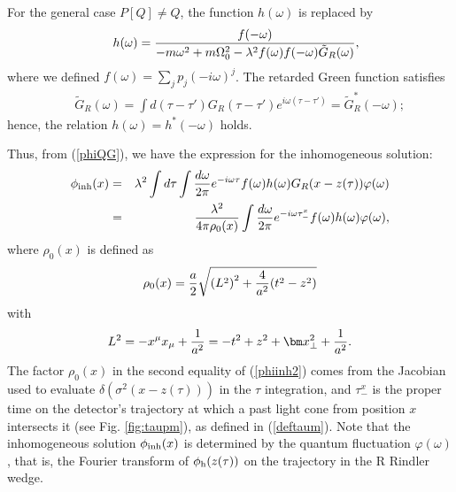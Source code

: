 \documentclass[aps,prd,preprintnumbers,nofootinbib,showpacs]{revtex4}%
\begin{document}
\begin{widetext}
For the general case $P[Q]\neq Q$, the function $h(\omega)$ is replaced by
\begin{eqnarray}
&&h(\omega)={f(-\omega)\over -m\omega^2+m\Omega_0^2-\lambda^2f(\omega)f(-\omega)\tilde G_R(\omega)}, 
\label{defhomega}
\end{eqnarray}
where we defined $f(\omega)=\sum_j p_j(-i\omega)^j$. The retarded Green function satisfies
\begin{eqnarray}
&&\tilde G_R(\omega)= \int d(\tau-\tau') G_R(\tau-\tau') e^{i\omega(\tau-\tau')}=\tilde G_R^*(-\omega);
\label{deftildeGR}
\end{eqnarray}
hence, the relation $h(\omega)=h^*(-\omega)$ holds. 

Thus, from (\ref{phiQG}), we have the expression for the inhomogeneous solution: 
\begin{eqnarray}
\phi_{\rm inh}(x)&=&\lambda^2 \int d\tau\int {d\omega\over2\pi}e^{-i\omega\tau}
f(\omega)h(\omega)G_R(x-z(\tau))\varphi(\omega)
\nonumber\\
&=&{\lambda^2 \over 4\pi \rho_0(x)}\int {d\omega\over2\pi}e^{-i\omega\tau_-^x}
f(\omega)h(\omega)\varphi(\omega),
\label{phiinh2}
\end{eqnarray}
where $\rho_0(x)$ is defined as 
\begin{eqnarray}
\rho_0(x)={a\over 2}\sqrt{\left(L^2\right)^2+{4\over a^2}(t^2-z^2)}
\label{defrho0}
\end{eqnarray}
with
\begin{eqnarray}
L^2=-x^\mu x_\mu+{1\over a^2}=-t^2+z^2+\bm x_\perp^2+{1\over a^2}. 
\end{eqnarray}
The factor $\rho_0(x)$ in the second equality of (\ref{phiinh2})  
comes from the Jacobian used to evaluate $\delta(\sigma^2(x-z(\tau)))$ 
in the $\tau$ integration, and $\tau_-^x$ is the proper time on the detector's trajectory at which
a past light cone from position $x$ intersects it (see Fig. \ref{fig:taupm}), 
as defined in (\ref{deftaum}).
Note that the inhomogeneous solution $\phi_{\rm inh}(x)$ is determined by 
the quantum fluctuation $\varphi(\omega)$, that is, the Fourier transform of 
 $\phi_{\rm h}(z(\tau))$ on the trajectory in the R Rindler wedge.


\end{widetext}
\end{document}
